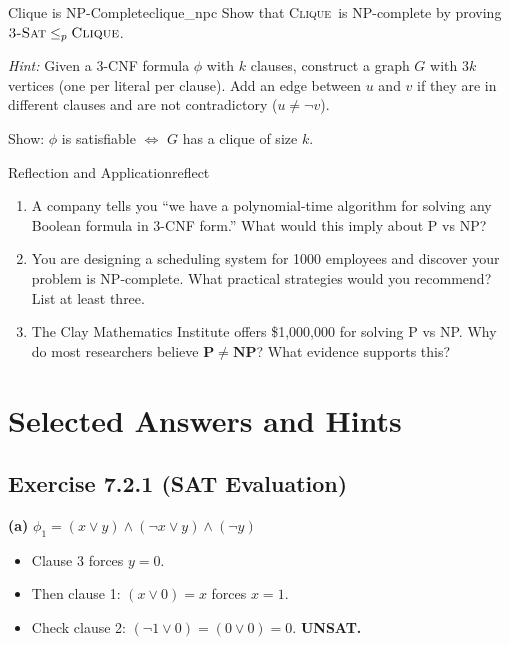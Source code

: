 \documentclass[12pt,a4paper]{article}
\newcommand{\P}{\mathbf{P}}
\newcommand{\NP}{\mathbf{NP}}
\newcommand{\TSAT}{\textsc{3-Sat}}
\newcommand{\CLIQUE}{\textsc{Clique}}
\newcommand{\leqp}{\leq_p}
\begin{document}
\begin{exercise}{Clique is NP-Complete}{clique_npc}
Show that \CLIQUE\ is NP-complete by proving $\TSAT \leqp \CLIQUE$.

\medskip
\textit{Hint:} Given a 3-CNF formula $\phi$ with $k$ clauses, construct a graph $G$ 
with $3k$ vertices (one per literal per clause). Add an edge between $u$ and $v$ if 
they are in different clauses and are not contradictory ($u \neq \neg v$).

Show: $\phi$ is satisfiable $\iff$ $G$ has a clique of size $k$.
\end{exercise}

\begin{exercise}{Reflection and Application}{reflect}
\begin{enumerate}[label=(\alph*),leftmargin=2em]
  \item A company tells you ``we have a polynomial-time algorithm for solving any 
    Boolean formula in 3-CNF form.'' What would this imply about P vs NP?
  \item You are designing a scheduling system for 1000 employees and discover 
    your problem is NP-complete. What practical strategies would you recommend? 
    List at least three.
  \item The Clay Mathematics Institute offers \$1,000,000 for solving P vs NP. 
    Why do most researchers believe $\P \neq \NP$? What evidence supports this?
\end{enumerate}
\end{exercise}

\newpage

\section{Selected Answers and Hints}

\subsection*{Exercise 7.2.1 (SAT Evaluation)}

\noindent\textbf{(a)} $\phi_1 = (x \lor y) \land (\neg x \lor y) \land (\neg y)$
\begin{itemize}[leftmargin=2em]
  \item Clause 3 forces $y = 0$.
  \item Then clause 1: $(x \lor 0) = x$ forces $x = 1$.
  \item Check clause 2: $(\neg 1 \lor 0) = (0 \lor 0) = 0$. \textbf{UNSAT.}
\end{itemize}
\end{document}
